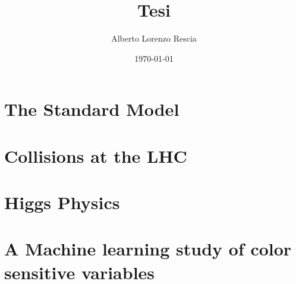 \documentclass[10pt,a4paper]{book}
\title{Tesi}
\author{Alberto Lorenzo Rescia}
\date{\today}
\begin{document}
\chapter{The Standard Model}


\chapter{Collisions at the LHC}


\chapter{Higgs Physics}


\chapter{A Machine learning study of color sensitive variables}





\end{document}
